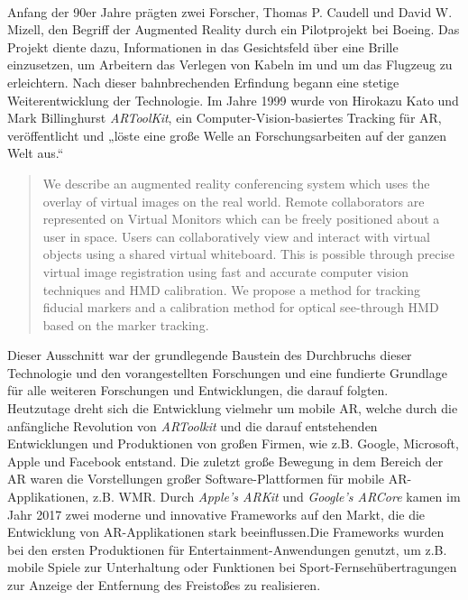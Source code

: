\\ 
Anfang der 90er Jahre prägten zwei Forscher, Thomas P. Caudell und David W. Mizell, den Begriff der Augmented Reality durch ein Pilotprojekt
bei Boeing. Das Projekt diente dazu, Informationen in das Gesichtsfeld über eine Brille einzusetzen, um Arbeitern das Verlegen von Kabeln im und um das 
Flugzeug zu erleichtern. Nach dieser bahnbrechenden Erfindung begann eine stetige Weiterentwicklung der Technologie. Im Jahre 1999 wurde 
von Hirokazu Kato und Mark Billinghurst \textit{ARToolKit}, ein Computer-Vision-basiertes Tracking für AR, veröffentlicht und „löste eine 
große Welle an Forschungsarbeiten auf der ganzen Welt aus.“ \cite{springer.2019s} 
\begin{quote}
    We describe an augmented reality conferencing system which uses the overlay of virtual images on the real world. Remote collaborators 
    are represented on Virtual Monitors which can be freely positioned about a user in space. Users can collaboratively view and interact 
    with virtual objects using a shared virtual whiteboard. This is possible through precise virtual image registration using fast and 
    accurate computer vision techniques and HMD calibration. We propose a method for tracking fiducial markers and a calibration method 
    for optical see-through HMD based on the marker tracking. \cite{artoolkitsheet.1999o}
\end{quote}
Dieser Ausschnitt war der grundlegende Baustein des Durchbruchs dieser Technologie und den vorangestellten Forschungen und eine fundierte 
Grundlage für alle weiteren Forschungen und Entwicklungen, die darauf folgten. 
\\ 
Heutzutage dreht sich die Entwicklung vielmehr um mobile AR, welche durch die anfängliche Revolution von \textit{ARToolkit} und die darauf 
entstehenden Entwicklungen und Produktionen von großen Firmen, wie z.B. Google, Microsoft, Apple und Facebook entstand. Die zuletzt große 
Bewegung in dem Bereich der AR waren die Vorstellungen großer Software-Plattformen für mobile \acs{AR}-Applikationen, z.B. \acl{WMR}. Durch 
\textit{Apple's ARKit} und \textit{Google's ARCore} kamen im Jahr 2017 zwei moderne und innovative Frameworks auf den Markt, die die 
Entwicklung von \acl{AR}-Applikationen stark beeinflussen.Die Frameworks wurden bei den ersten Produktionen für Entertainment-Anwendungen 
genutzt, um z.B. mobile Spiele zur Unterhaltung oder Funktionen bei Sport-Fernsehübertragungen zur Anzeige der Entfernung des Freistoßes zu 
realisieren.
\\ 
\linebreak
